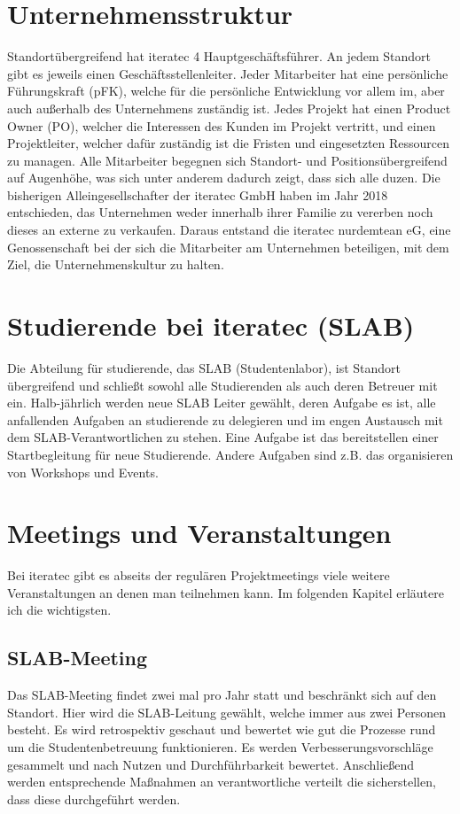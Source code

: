 \section{Unternehmensstruktur}
Standortübergreifend hat iteratec 4 Hauptgeschäftsführer. An jedem Standort gibt es jeweils einen
Geschäftsstellenleiter. Jeder Mitarbeiter hat eine persönliche Führungskraft (pFK), welche für die persönliche
Entwicklung vor allem im, aber auch außerhalb des Unternehmens zuständig ist. Jedes Projekt hat einen Product Owner
(PO), welcher die Interessen des Kunden im Projekt vertritt, und einen Projektleiter, welcher dafür zuständig ist die
Fristen und eingesetzten Ressourcen zu managen. Alle Mitarbeiter begegnen sich Standort- und Positionsübergreifend auf
Augenhöhe, was sich unter anderem dadurch zeigt, dass sich alle duzen. Die bisherigen Alleingesellschafter der iteratec
GmbH haben im Jahr 2018 entschieden, das Unternehmen weder innerhalb ihrer Familie zu vererben noch dieses an externe zu
verkaufen. Daraus entstand die iteratec nurdemtean eG, eine Genossenschaft bei der sich die Mitarbeiter am Unternehmen
beteiligen, mit dem Ziel, die Unternehmenskultur zu halten.

\section{Studierende bei iteratec (SLAB)}
Die Abteilung für studierende, das SLAB (Studentenlabor), ist Standort übergreifend und schließt sowohl alle
Studierenden als auch deren Betreuer mit ein. Halb-jährlich werden neue SLAB Leiter gewählt, deren Aufgabe es ist, alle
anfallenden Aufgaben an studierende zu delegieren und im engen Austausch mit dem SLAB-Verantwortlichen zu stehen. Eine
Aufgabe ist das bereitstellen einer Startbegleitung für neue Studierende. Andere Aufgaben sind z.B. das organisieren von
Workshops und Events.

\section{Meetings und Veranstaltungen}
Bei iteratec gibt es abseits der regulären Projektmeetings viele weitere Veranstaltungen an denen man teilnehmen kann.
Im folgenden Kapitel erläutere ich die wichtigsten.

\subsection{SLAB-Meeting}
Das SLAB-Meeting findet zwei mal pro Jahr statt und beschränkt sich auf den Standort. Hier wird die SLAB-Leitung
gewählt, welche immer aus zwei Personen besteht. Es wird retrospektiv geschaut und bewertet wie gut die Prozesse rund um
die Studentenbetreuung funktionieren. Es werden Verbesserungsvorschläge gesammelt und nach Nutzen und Durchführbarkeit
bewertet. Anschließend werden entsprechende Maßnahmen an verantwortliche verteilt die sicherstellen, dass diese
durchgeführt werden.

